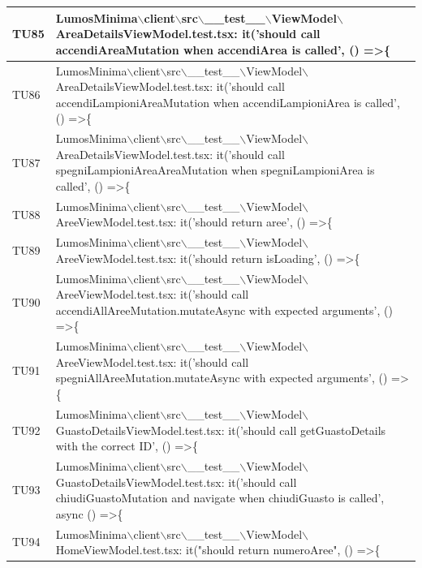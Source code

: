 \documentclass[12pt]{article}
\begin{document}
\begin{scriptsize}
\begin{xltabular}{\linewidth}{|>{\hsize}X|X|}
	TU85 & LumosMinima$\backslash$client$\backslash$src$\backslash$\_\_test\_\_$\backslash$ViewModel$\backslash$AreaDetailsViewModel.test.tsx: it('should call accendiAreaMutation when accendiArea is called', () =\textgreater \{ \\ \hline
	TU86 & LumosMinima$\backslash$client$\backslash$src$\backslash$\_\_test\_\_$\backslash$ViewModel$\backslash$AreaDetailsViewModel.test.tsx: it('should call accendiLampioniAreaMutation when accendiLampioniArea is called', () =\textgreater \{ \\ \hline
	TU87 & LumosMinima$\backslash$client$\backslash$src$\backslash$\_\_test\_\_$\backslash$ViewModel$\backslash$AreaDetailsViewModel.test.tsx: it('should call spegniLampioniAreaAreaMutation when spegniLampioniArea is called', () =\textgreater \{ \\ \hline
	TU88 & LumosMinima$\backslash$client$\backslash$src$\backslash$\_\_test\_\_$\backslash$ViewModel$\backslash$AreeViewModel.test.tsx: it('should return aree', () =\textgreater \{ \\ \hline
	TU89 & LumosMinima$\backslash$client$\backslash$src$\backslash$\_\_test\_\_$\backslash$ViewModel$\backslash$AreeViewModel.test.tsx: it('should return isLoading', () =\textgreater \{ \\ \hline
	TU90 & LumosMinima$\backslash$client$\backslash$src$\backslash$\_\_test\_\_$\backslash$ViewModel$\backslash$AreeViewModel.test.tsx: it('should call accendiAllAreeMutation.mutateAsync with expected arguments', () =\textgreater \{ \\ \hline
	TU91 & LumosMinima$\backslash$client$\backslash$src$\backslash$\_\_test\_\_$\backslash$ViewModel$\backslash$AreeViewModel.test.tsx: it('should call spegniAllAreeMutation.mutateAsync with expected arguments', () =\textgreater \{ \\ \hline
	TU92 & LumosMinima$\backslash$client$\backslash$src$\backslash$\_\_test\_\_$\backslash$ViewModel$\backslash$GuastoDetailsViewModel.test.tsx: it('should call getGuastoDetails with the correct ID', () =\textgreater \{ \\ \hline
	TU93 & LumosMinima$\backslash$client$\backslash$src$\backslash$\_\_test\_\_$\backslash$ViewModel$\backslash$GuastoDetailsViewModel.test.tsx: it('should call chiudiGuastoMutation and navigate when chiudiGuasto is called', async () =\textgreater \{ \\ \hline
	TU94 & LumosMinima$\backslash$client$\backslash$src$\backslash$\_\_test\_\_$\backslash$ViewModel$\backslash$HomeViewModel.test.tsx: it("should return numeroAree", () =\textgreater \{ \\ \hline

\end{xltabular}
\end{scriptsize}
\end{document}
